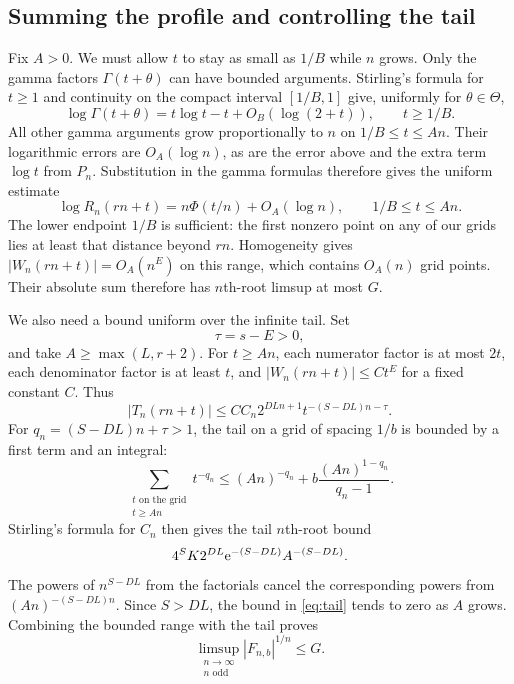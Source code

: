 \subsection{Summing the profile and controlling the tail}
\label{sec:profile-sum}

Fix $A>0$. We must allow $t$ to stay as small as $1/B$ while
$n$ grows. Only the gamma factors $\Gamma(t+\theta)$ can have
bounded arguments. Stirling's formula for $t\ge1$ and continuity
on the compact interval $[1/B,1]$ give, uniformly for
$\theta\in\Theta$,
\[
 \log\Gamma(t+\theta)=t\log t-t+O_B(\log(2+t)),
 \qquad t\ge1/B.
\]
All other gamma arguments grow proportionally to $n$ on
$1/B\le t\le An$. Their logarithmic errors are $O_A(\log n)$,
as are the error above and the extra term $\log t$ from $P_n$.
Substitution in the gamma formulas therefore gives the uniform estimate
\[
 \log R_n(rn+t)=n\Phi(t/n)+O_A(\log n),
                       \qquad 1/B\le t\le An.
\]
The lower endpoint $1/B$ is sufficient: the first nonzero point on
any of our grids lies at least that distance beyond $rn$.
Homogeneity gives $|W_n(rn+t)|=O_A(n^E)$ on this range, which
contains $O_A(n)$ grid points. Their absolute sum therefore has
$n$th-root limsup at most $G$.

We also need a bound uniform over the infinite tail. Set
\begin{equation}\label{eq:tau}
 \tau=s-E>0,
\end{equation}
and take $A\ge\max(L,r+2)$. For $t\ge An$, each numerator factor
is at most $2t$, each denominator factor is at least $t$, and
$|W_n(rn+t)|\le C t^E$ for a fixed constant $C$. Thus
\[
 |T_n(rn+t)|\le C C_n2^{DLn+1}
                      t^{-(S-DL)n-\tau}.
\]
For $q_n=(S-DL)n+\tau>1$, the tail on a grid of spacing $1/b$
is bounded by a first term and an integral:
\[
 \sum_{\substack{t\text{ on the grid}\\t\ge An}}t^{-q_n}
 \le(An)^{-q_n}+b\frac{(An)^{1-q_n}}{q_n-1}.
\]
Stirling's formula for $C_n$ then gives the tail $n$th-root bound
\begin{equation}\label{eq:tail}
 4^S K2^{DL}\mathrm e^{-(S-DL)}A^{-(S-DL)}.
\end{equation}
The powers of $n^{S-DL}$ from the factorials cancel the corresponding
powers from $(An)^{-(S-DL)n}$. Since $S>DL$, the bound in
\eqref{eq:tail} tends to zero as $A$ grows. Combining the bounded
range with the tail proves
\begin{equation}\label{eq:uncleared-decay}
 \limsup_{\substack{n\to\infty\\n\text{ odd}}}|F_{n,b}|^{1/n}\le G.
\end{equation}


